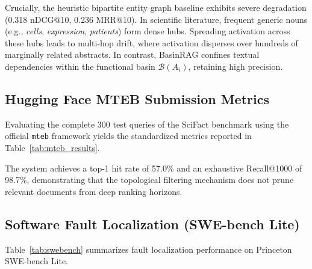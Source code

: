 \documentclass[10pt,twocolumn]{article}
\theoremstyle{definition}
\begin{document}
Crucially, the heuristic bipartite entity graph baseline exhibits severe degradation (0.318 nDCG@10, 0.236 MRR@10). In scientific literature, frequent generic nouns (e.g., \textit{cells}, \textit{expression}, \textit{patients}) form dense hubs. Spreading activation across these hubs leads to multi-hop drift, where activation disperses over hundreds of marginally related abstracts. In contrast, BasinRAG confines textual dependencies within the functional basin $\mathcal{B}(A_i)$, retaining high precision.

\subsection{Hugging Face MTEB Submission Metrics}

Evaluating the complete 300 test queries of the SciFact benchmark using the official \texttt{mteb} framework yields the standardized metrics reported in Table~\ref{tab:mteb_results}.

\begin{table}[t]
\centering
\caption{Official MTEB SciFact test-set results ($k \le 1000$).}
\label{tab:mteb_results}
\end{table}

The system achieves a top-1 hit rate of 57.0\% and an exhaustive Recall@1000 of 98.7\%, demonstrating that the topological filtering mechanism does not prune relevant documents from deep ranking horizons.

\subsection{Software Fault Localization (SWE-bench Lite)}

Table~\ref{tab:swebench} summarizes fault localization performance on Princeton SWE-bench Lite.
\end{document}
